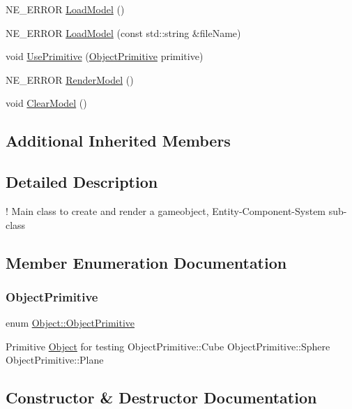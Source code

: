 \begin{DoxyCompactItemize}
\item 
N\+E\+\_\+\+E\+R\+R\+OR \mbox{\hyperlink{class_object_aebbb9ab99f56ecb88e7a84b4e24e81b9}{Load\+Model}} ()
\item 
N\+E\+\_\+\+E\+R\+R\+OR \mbox{\hyperlink{class_object_a149a42acd59c004806d15e5dd334473f}{Load\+Model}} (const std\+::string \&file\+Name)
\item 
void \mbox{\hyperlink{class_object_a7410f426afc88277ad120c83dee28d05}{Use\+Primitive}} (\mbox{\hyperlink{class_object_a0b1996af0cb36adfb3770ca9d3166253}{Object\+Primitive}} primitive)
\item 
N\+E\+\_\+\+E\+R\+R\+OR \mbox{\hyperlink{class_object_a357d3469a47d0272bb03b84ff0b27255}{Render\+Model}} ()
\item 
void \mbox{\hyperlink{class_object_aa7b0a877f291651c2a03fc62e4271653}{Clear\+Model}} ()
\end{DoxyCompactItemize}
\subsection*{Additional Inherited Members}


\subsection{Detailed Description}
! Main class to create and render a gameobject, Entity-\/\+Component-\/\+System sub-\/class 

\subsection{Member Enumeration Documentation}
\mbox{\label{class_object_a0b1996af0cb36adfb3770ca9d3166253}} 
\subsubsection{\texorpdfstring{ObjectPrimitive}{ObjectPrimitive}}
{\footnotesize\ttfamily enum \mbox{\hyperlink{class_object_a0b1996af0cb36adfb3770ca9d3166253}{Object\+::\+Object\+Primitive}}}

Primitive \mbox{\hyperlink{class_object}{Object}} for testing Object\+Primitive\+::\+Cube Object\+Primitive\+::\+Sphere Object\+Primitive\+::\+Plane 

\subsection{Constructor \& Destructor Documentation}
\mbox{\label{class_object_a40860402e64d8008fb42329df7097cdb}} 
